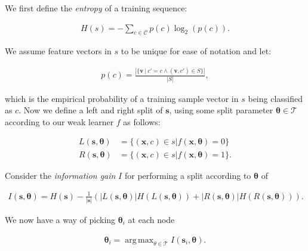 \documentclass[12pt,twoside,notitlepage]{report}
\newcommand{\vc}[1]{\mathbf{#1}}
\newcommand{\cl}[1]{\mathcal{#1}}
\DeclareMathOperator*{\argmax}{arg\,max}
\begin{document}
            We first define the \textit{entropy} of a training sequence:

            \begin{align}
                H(s) = - \sum_{c\in\cl{C}} p(c) \log_2 (p(c)).
                \label{eq:training_seq_entropy}
            \end{align}

            We assume feature vectors in $s$ to be unique for ease of notation and let:

            \begin{align}
                p(c) = \frac{\left| \{\vc{v}\ |\ c' = c \land (\vc{v},c') \in S \} \right|}{\left| S \right|},
                \label{eq:empirical_distribution}
            \end{align}
            
            which is the empirical probability of a training sample vector in $s$ being classified as $c$. Now we define 
            a left and right split of $\vc{s}$, using some split parameter $\vc{\theta} \in \cl{T}$ according to our weak 
            learner $f$ as follows:

            \begin{align}
                L(\vc{s},\vc{\theta}) & = \{ (\vc{x}, c) \in s | f(\vc{x}, \vc{\theta}) = 0 \}  \label{eq:left_split}\\
                R(\vc{s},\vc{\theta}) & = \{ (\vc{x}, c) \in s | f(\vc{x}, \vc{\theta}) = 1 \}. \label{eq:right_split}
            \end{align}

            Consider the \textit{information gain} $I$ for performing a split according to $\vc{\theta}$ of 

            \begin{align}
                I(\vc{s}, \vc{\theta}) = H(\vc{s}) - \frac{1}{|\vc{s}|} \left( |L(\vc{s}, \vc{\theta})| H(L(\vc{s}, \vc{\theta})) 
                                                                          + |R(\vc{s}, \vc{\theta})| H(R(\vc{s}, \vc{\theta})) \right).
                \label{eq:information_gain}
            \end{align} 

            We now have a way of picking $\vc{\theta}_i$ at each node

            \begin{align} 
                \vc{\theta}_i = \argmax_{\theta\in\cl{T}} I(\vc{s}_i, \vc{\theta}).
            \end{align} 
\end{document}
